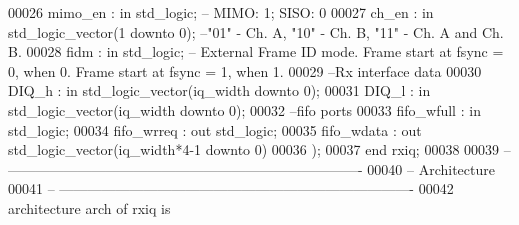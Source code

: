 \begin{DoxyCode}
00026         \textcolor{vhdlchar}{mimo_en}     \textcolor{vhdlchar}{:} \textcolor{keywordflow}{in} \textcolor{comment}{std\_logic};\textcolor{keyword}{ -- MIMO: 1; SISO: 0}
00027         \textcolor{vhdlchar}{ch_en}           \textcolor{vhdlchar}{:} \textcolor{keywordflow}{in} \textcolor{comment}{std\_logic\_vector}\textcolor{vhdlchar}{(}\textcolor{vhdllogic}{}\textcolor{vhdllogic}{1} \textcolor{keywordflow}{downto} \textcolor{vhdllogic}{}\textcolor{vhdllogic}{0}\textcolor{vhdlchar}{)};\textcolor{keyword}{ --"01" - Ch. A, "10" - Ch. B, "11" - Ch. A and
       Ch. B.  }
00028         \textcolor{vhdlchar}{fidm}            \textcolor{vhdlchar}{:} \textcolor{keywordflow}{in} \textcolor{comment}{std\_logic};\textcolor{keyword}{ -- External Frame ID mode. Frame start at fsync = 0, when 0. Frame
       start at fsync = 1, when 1.}
00029 \textcolor{keyword}{      --Rx interface data }
00030       \textcolor{vhdlchar}{DIQ_h}         \textcolor{vhdlchar}{:} \textcolor{keywordflow}{in} \textcolor{comment}{std\_logic\_vector}\textcolor{vhdlchar}{(}\textcolor{vhdlchar}{iq_width} \textcolor{keywordflow}{downto} \textcolor{vhdllogic}{}\textcolor{vhdllogic}{0}\textcolor{vhdlchar}{)};
00031         \textcolor{vhdlchar}{DIQ_l}          \textcolor{vhdlchar}{:} \textcolor{keywordflow}{in} \textcolor{comment}{std\_logic\_vector}\textcolor{vhdlchar}{(}\textcolor{vhdlchar}{iq_width} \textcolor{keywordflow}{downto} \textcolor{vhdllogic}{}\textcolor{vhdllogic}{0}\textcolor{vhdlchar}{)};
00032 \textcolor{keyword}{      --fifo ports }
00033       \textcolor{vhdlchar}{fifo_wfull}  \textcolor{vhdlchar}{:} \textcolor{keywordflow}{in} \textcolor{comment}{std\_logic};
00034       \textcolor{vhdlchar}{fifo_wrreq}  \textcolor{vhdlchar}{:} \textcolor{keywordflow}{out} \textcolor{comment}{std\_logic};
00035       \textcolor{vhdlchar}{fifo_wdata}  \textcolor{vhdlchar}{:} \textcolor{keywordflow}{out} \textcolor{comment}{std\_logic\_vector}\textcolor{vhdlchar}{(}\textcolor{vhdlchar}{iq_width}\textcolor{vhdlchar}{*}\textcolor{vhdllogic}{4-1} \textcolor{keywordflow}{downto} \textcolor{vhdllogic}{}\textcolor{vhdllogic}{0}\textcolor{vhdlchar}{)}        
00036         \textcolor{vhdlchar}{)};
00037 \textcolor{keywordflow}{end} \textcolor{vhdlchar}{rxiq};
00038 
00039 \textcolor{keyword}{-- ----------------------------------------------------------------------------}
00040 \textcolor{keyword}{-- Architecture}
00041 \textcolor{keyword}{-- ----------------------------------------------------------------------------}
00042 \textcolor{keywordflow}{architecture} arch \textcolor{keywordflow}{of} rxiq is

\end{DoxyCode}
